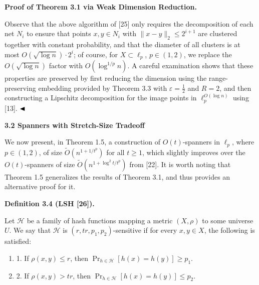 \par
\par
\par
\par
\par\medskip\noindent\textbf{Proof of Theorem 3.1 via Weak Dimension Reduction.}\par
Observe that the above algorithm of [25] only requires the decomposition of each net $N_{i}$ to ensure that points $x,y\in N_{i}$ with $\|x-y\|_{2}\leq 2^{i+1}$ are clustered together with constant probability, and that the diameter of all clusters is at most $O(\sqrt{\log{n}})\cdot 2^{i}$; of course, for $X\subset\ell_{p}$, $p\in(1,2)$, we replace the $O(\sqrt{\log{n}})$ factor with $O(\log^{1/p}{n})$. A careful examination shows that these properties are preserved by first reducing the dimension using the range-preserving embedding provided by Theorem 3.3 with $\varepsilon=\frac{1}{2}$ and $R=2$, and then constructing a Lipschitz decomposition for the image points in $\ell_{p}^{O(\log{n})}$ using [13]. $\hfill\blacktriangleleft$
\par
\par
\par
\par
\par\medskip\noindent\textbf{3.2 Spanners with Stretch-Size Tradeoff}\par
We now present, in Theorem 1.5, a construction of $O(t)$-spanners in $\ell_{p}$, where $p\in(1,2)$, of size $\tilde{O}(n^{1+1/t^{p}})$ for all $t\geq 1$, which slightly improves over the $O(t)$-spanners of size $\tilde{O}(n^{1+\log^{2}{t}/t^{p}})$ from [22]. It is worth noting that Theorem 1.5 generalizes the results of Theorem 3.1, and thus provides an alternative proof for it.
\par
\par
\par\medskip\noindent\textbf{Definition 3.4 (LSH [26]).}\par
Let $\mathcal{H}$ be a family of hash functions mapping a metric $(X,\rho)$ to some universe $U$. We say that $\mathcal{H}$ is $(r,tr,p_{1},p_{2})$-sensitive if for every $x,y\in X$, the following is satisfied:
\par
\begin{enumerate}
\item[]  1. 
If $\rho(x,y)\leq r$, then $\Pr_{h\in\mathcal{H}}[h(x)=h(y)]\geq p_{1}$.
\par
\par
\item[]  2. 
If $\rho(x,y)>tr$, then $\Pr_{h\in\mathcal{H}}[h(x)=h(y)]\leq p_{2}$.
\par
\par
\end{enumerate}
